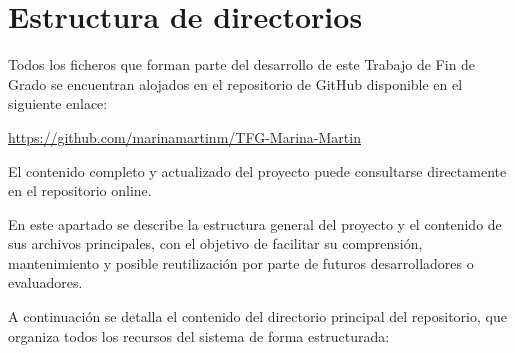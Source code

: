 \label{anexo:manual-desarrollador}



\section{Estructura de directorios}
Todos los ficheros que forman parte del desarrollo de este Trabajo de Fin de Grado se encuentran alojados en el repositorio de GitHub disponible en el siguiente enlace: 

\begin{center}
    \url{https://github.com/marinamartinm/TFG-Marina-Martin}
\end{center}

El contenido completo y actualizado del proyecto puede consultarse directamente en el repositorio online.

En este apartado se describe la estructura general del proyecto y el contenido de sus archivos principales, con el objetivo de facilitar su comprensión, mantenimiento y posible reutilización por parte de futuros desarrolladores o evaluadores.

A continuación se detalla el contenido del directorio principal del repositorio, que organiza todos los recursos del sistema de forma estructurada:

